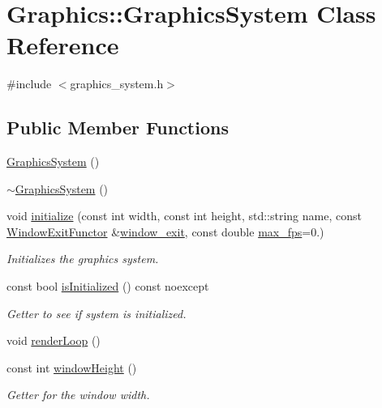 \hypertarget{class_graphics_1_1_graphics_system}{}\section{Graphics\+:\+:Graphics\+System Class Reference}
\label{class_graphics_1_1_graphics_system}


{\ttfamily \#include $<$graphics\+\_\+system.\+h$>$}

\subsection*{Public Member Functions}
\begin{DoxyCompactItemize}
\item 
\hyperlink{class_graphics_1_1_graphics_system_a748459586ae5ea2aa8721dddb8660de6}{Graphics\+System} ()
\item 
\hyperlink{class_graphics_1_1_graphics_system_a6504df337bfae3a08abc8a63deb6df37}{$\sim$\+Graphics\+System} ()
\item 
void \hyperlink{class_graphics_1_1_graphics_system_a0666cab04b1c7f3ca4dac67f7529cace}{initialize} (const int width, const int height, std\+::string name, const \hyperlink{class_graphics_1_1_window_exit_functor}{Window\+Exit\+Functor} \&\hyperlink{class_graphics_1_1_graphics_system_ac31d552052e7afd10043456ee9393e1a}{window\+\_\+exit}, const double \hyperlink{class_graphics_1_1_graphics_system_ad963821cfb09e6a0e672cf6876e944dd}{max\+\_\+fps}=0.)
\begin{DoxyCompactList}\small\item\em Initializes the graphics system. \end{DoxyCompactList}\item 
const bool \hyperlink{class_graphics_1_1_graphics_system_a1bd027633e66df5a65f2df33952d1dbd}{is\+Initialized} () const noexcept
\begin{DoxyCompactList}\small\item\em Getter to see if system is initialized. \end{DoxyCompactList}\item 
void \hyperlink{class_graphics_1_1_graphics_system_af222ab3a8a83796ad1c12ccf95a6f37a}{render\+Loop} ()
\item 
const int \hyperlink{class_graphics_1_1_graphics_system_a09710fc777ac4db1b44c63c2921d217f}{window\+Height} ()
\begin{DoxyCompactList}\small\item\em Getter for the window width. \end{DoxyCompactList}\item 

\end{DoxyCompactItemize}
